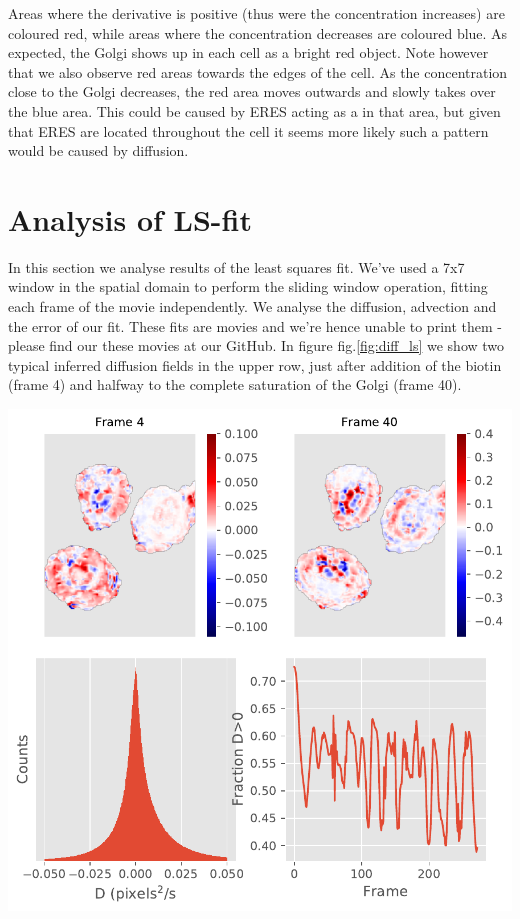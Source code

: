 \documentclass{Dissertate}
\let\origfigure\figure
\let\endorigfigure\endfigure
\renewenvironment{figure}[1][2] {
    \expandafter\origfigure\expandafter[H]
} {
    \endorigfigure
}
\begin{document}
Areas where the derivative is positive (thus were the concentration
increases) are coloured red, while areas where the concentration
decreases are coloured blue. As expected, the Golgi shows up in each
cell as a bright red object. Note however that we also observe red areas
towards the edges of the cell. As the concentration close to the Golgi
decreases, the red area moves outwards and slowly takes over the blue
area. This could be caused by ERES acting as a in that area, but given
that ERES are located throughout the cell it seems more likely such a
pattern would be caused by diffusion.

\hypertarget{analysis-of-ls-fit}{%
\section{Analysis of LS-fit}\label{analysis-of-ls-fit}}

In this section we analyse results of the least squares fit. We've used
a 7x7 window in the spatial domain to perform the sliding window
operation, fitting each frame of the movie independently. We analyse the
diffusion, advection and the error of our fit. These fits are movies and
we're hence unable to print them - please find our these movies at our
GitHub. In figure fig.\ref{fig:diff_ls} we show two typical inferred
diffusion fields in the upper row, just after addition of the biotin
(frame 4) and halfway to the complete saturation of the Golgi (frame
40).

\begin{figure}
\hypertarget{fig:diff_ls}{%
\centering
\includegraphics{source/figures/pdf/Diff.pdf}
\caption{Analysis of the inferred diffusion field. The upper row shows
the inferred field at two frames, while the lower row shows the
distribution of values and the fraction of physical values as a function
of time.}\label{fig:diff_ls}
}
\end{figure}
\end{document}
